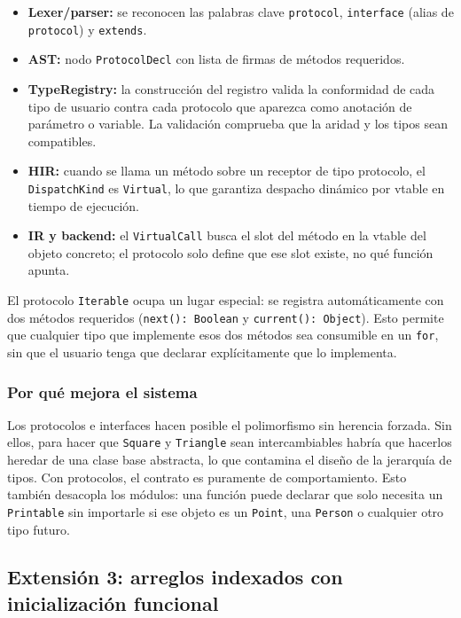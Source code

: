 \documentclass[12pt,letterpaper]{article}
\newcommand{\src}[1]{\texttt{#1}}
\begin{document}
\begin{itemize}
    \item \textbf{Lexer/parser:} se reconocen las palabras clave \src{protocol}, \src{interface} (alias de \src{protocol}) y \src{extends}.
    \item \textbf{AST:} nodo \src{ProtocolDecl} con lista de firmas de métodos requeridos.
    \item \textbf{TypeRegistry:} la construcción del registro valida la conformidad de cada tipo de usuario contra cada protocolo que aparezca como anotación de parámetro o variable. La validación comprueba que la aridad y los tipos sean compatibles.
    \item \textbf{HIR:} cuando se llama un método sobre un receptor de tipo protocolo, el \src{DispatchKind} es \src{Virtual}, lo que garantiza despacho dinámico por vtable en tiempo de ejecución.
    \item \textbf{IR y backend:} el \src{VirtualCall} busca el slot del método en la vtable del objeto concreto; el protocolo solo define que ese slot existe, no qué función apunta.
\end{itemize}

El protocolo \src{Iterable} ocupa un lugar especial: se registra automáticamente con dos métodos requeridos (\src{next(): Boolean} y \src{current(): Object}). Esto permite que cualquier tipo que implemente esos dos métodos sea consumible en un \src{for}, sin que el usuario tenga que declarar explícitamente que lo implementa.

\subsubsection{Por qué mejora el sistema}

Los protocolos e interfaces hacen posible el polimorfismo sin herencia forzada. Sin ellos, para hacer que \src{Square} y \src{Triangle} sean intercambiables habría que hacerlos heredar de una clase base abstracta, lo que contamina el diseño de la jerarquía de tipos. Con protocolos, el contrato es puramente de comportamiento. Esto también desacopla los módulos: una función puede declarar que solo necesita un \src{Printable} sin importarle si ese objeto es un \src{Point}, una \src{Person} o cualquier otro tipo futuro.

\subsection{Extensión 3: arreglos indexados con inicialización funcional}
\end{document}
